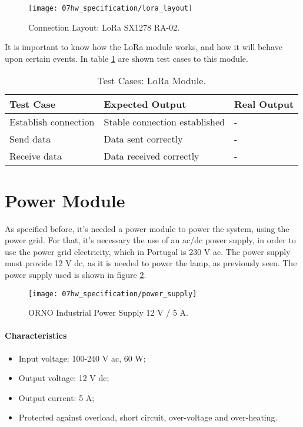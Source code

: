 \begin{figure}[H]
	\centering
	\texttt{[image: 07hw\_specification/lora\_layout]}
	\caption{Connection Layout: LoRa SX1278 RA-02.}
	\label{fig:loraLayout}
\end{figure}


It is important to know how the LoRa module works, and how it will behave upon certain events. In table \ref{table:test_lora} are shown test cases to this module.

\begin{table}[H]
	\centering
	\resizebox{\columnwidth}{!}
	{
		\begin{tabular}{|m{3cm}|m{5cm}||m{5cm}|}
			\hline
			\textbf{Test Case} & \textbf{Expected Output} & \textbf{Real Output}
			\\\hline\hline
			Establish connection & Stable connection established & -
			\\\hline
			Send data & Data sent correctly & -
			\\\hline
			Receive data & Data received correctly & -
			\\\hline
		\end{tabular}
	}
	\caption{Test Cases: LoRa Module.}
	\label{table:test_lora}
\end{table}

\section{Power Module}
As specified before, it's needed a power module to power the system, using the power grid. For that, it's necessary the use of an \ac{ac}/\ac{dc} power supply, in order to use the power grid electricity, which in Portugal is 230 V \ac{ac}. The power supply must provide 12 V \ac{dc}, as it is needed to power the lamp, as previously seen. The power supply used is shown in figure \ref{fig:power_supply}. \cite{power_supply}

\begin{figure}[H]
	\centering
	\texttt{[image: 07hw\_specification/power\_supply]}
	\caption{ORNO Industrial Power Supply 12 V / 5 A.}
	\label{fig:power_supply}
\end{figure}

\paragraph*{Characteristics}
\begin{itemize}
	\item Input voltage: 100-240 V \ac{ac}, 60 W;
	\item Output voltage: 12 V \ac{dc};
	\item Output current: 5 A;
	\item Protected against overload, short circuit, over-voltage and over-heating.
\end{itemize}

